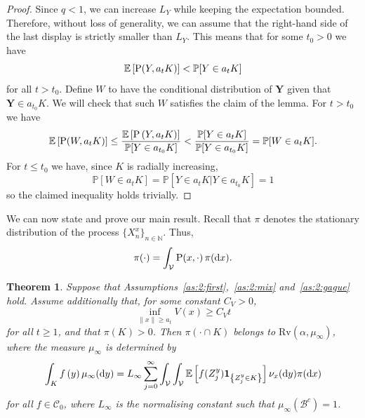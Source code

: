 \documentclass[preprint,12pt]{elsarticle}
\newtheorem{thm}{Theorem}[section]
\theoremstyle{definition}
\theoremstyle{remark}
\newcommand{\xbf}{{ x}}
\newcommand{\ybf}{{ y}}
\newcommand{\Xbf}{{ X}}
\newcommand{\Ybf}{{ Y}}
\newcommand{\Zbf}{{ Z}}
\newcommand{\Wbf}{{ W}}
\newcommand{\1}{{\mathbf 1}}
\numberwithin{equation}{section}
\newcommand{\Ebb}{\mathbb{E}}  %
\newcommand{\Nbb}{\mathbb{N}}
\newcommand{\Pbb}{\mathbb{P}}
\newcommand{\ud}{{\rm d}}
\newcommand{\Prm}{{\rm P}}
\newcommand{\Vcal}{\mathcal{V}}
\newcommand{\Bcal}{\mathcal{B}}
\begin{document}
\begin{proof}
	Since $q< 1$, we can increase $L_\Ybf$ while keeping the expectation bounded. 
    Therefore, without loss of generality, we can assume that the right-hand 
    side of the last display is strictly smaller than $L_\Ybf$.
	This means that for some $t_0>0$ we have  
	\begin{equation*}
      \Ebb \left[ \Prm(\Ybf, a_tK)  \right] < \Pbb[\Ybf \in a_t K]
	\end{equation*}
	for all $t>t_0$. 
	Define $\Wbf$ to have the conditional distribution of $\mathbf{Y}$ 
    given that $\mathbf{Y} \in a_{t_0}K$.
    We will check that such $\Wbf$ satisfies the claim of the lemma. 
    For $t>t_0$ we have
	\begin{equation*}
      \Ebb\left[\Prm(\Wbf, a_tK) \right] \leq 
      \frac{\Ebb\left[ \Prm\left( \Ybf, a_tK\right) \right]}{\Pbb[ \Ybf \in a_{t_0}K]} 
      < \frac{\Pbb[ \Ybf \in a_{t}K]}{\Pbb[ \Ybf \in a_{t_0}K]} =  \Pbb[\Wbf \in a_tK].
	\end{equation*}
	For $t\leq t_0$ we have, since $K$ is radially increasing, 
	\begin{equation*}
      \Pbb\left[ \Wbf \in a_t K \right] = 
      \Pbb \left[ \left. \Ybf \in a_t K \right| \Ybf \in a_{t_0}K \right] = 1
	\end{equation*}
	so the claimed inequality holds trivially.
  \end{proof}

  We can now state and prove our main result. Recall that $\pi$ denotes the 
  stationary distribution of the process $\{\Xbf_n^\xbf\}_{n\in \Nbb}$. 
  Thus,
  \begin{equation*}
    \pi(\cdot) = \int_{\Vcal} \Prm(\xbf, \cdot)\, \pi(\ud \xbf).
  \end{equation*}

  \begin{thm}\label{thm:2:pi}
    Suppose that Assumptions~\ref{as:2:first},~\ref{as:2:mix} 
    and~\ref{as:2:gague} hold. Assume additionally that, for some constant 
    $C_V > 0$,
    \begin{equation}\label{eq:2:veq}
      \inf_{\|\xbf\|\geq a_t} V(\xbf) \ge C_V t
    \end{equation}
    for all $t\geq 1$, and that $\pi(K) > 0$.
    Then $\pi(\cdot \cap K)$ belongs to $\mathrm{Rv}(\alpha, \mu_\infty)$, 
    where the measure $\mu_\infty$ is determined by
    \begin{equation*}
      \int_K f\left(\ybf\right) \mu_\infty(\ud \ybf)
      = L_\infty\sum_{j=0}^\infty \int_\Vcal\int_\Vcal 
      \Ebb\left[f(\Zbf_j^\ybf) 
      \mathbf{1}_{\left\{ \Zbf_j^\ybf \in K \right\}} \right] 
      \nu_{\xbf}(\ud \ybf) \pi(\ud \xbf)
    \end{equation*}
    for all $f \in \mathcal{C}_0$, where $L_\infty$ is the normalising constant such that $\mu_\infty(\Bcal^c)=1$.
  \end{thm}
\end{document}
